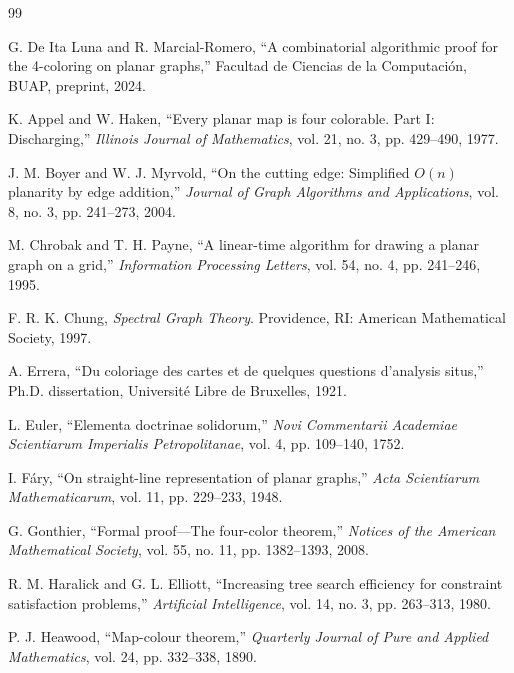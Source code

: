\documentclass[12pt,letterpaper]{article}
\theoremstyle{plain}
\theoremstyle{definition}
\theoremstyle{remark}
\begin{document}
\newpage

\begin{thebibliography}{99}

G. De Ita Luna and R. Marcial-Romero,
``A combinatorial algorithmic proof for the 4-coloring on planar graphs,''
Facultad de Ciencias de la Computaci\'on, BUAP, preprint, 2024.

K. Appel and W. Haken,
``Every planar map is four colorable. Part I: Discharging,''
\textit{Illinois Journal of Mathematics}, vol. 21, no. 3, pp. 429--490, 1977.

J. M. Boyer and W. J. Myrvold,
``On the cutting edge: Simplified $O(n)$ planarity by edge addition,''
\textit{Journal of Graph Algorithms and Applications}, vol. 8, no. 3,
pp. 241--273, 2004.

M. Chrobak and T. H. Payne,
``A linear-time algorithm for drawing a planar graph on a grid,''
\textit{Information Processing Letters}, vol. 54, no. 4, pp. 241--246, 1995.

F. R. K. Chung,
\textit{Spectral Graph Theory}.
Providence, RI: American Mathematical Society, 1997.

A. Errera,
``Du coloriage des cartes et de quelques questions d'analysis situs,''
Ph.D. dissertation, Universit\'e Libre de Bruxelles, 1921.

L. Euler,
``Elementa doctrinae solidorum,''
\textit{Novi Commentarii Academiae Scientiarum Imperialis Petropolitanae},
vol. 4, pp. 109--140, 1752.

I. F\'ary,
``On straight-line representation of planar graphs,''
\textit{Acta Scientiarum Mathematicarum}, vol. 11, pp. 229--233, 1948.

G. Gonthier,
``Formal proof---The four-color theorem,''
\textit{Notices of the American Mathematical Society}, vol. 55, no. 11,
pp. 1382--1393, 2008.

R. M. Haralick and G. L. Elliott,
``Increasing tree search efficiency for constraint satisfaction problems,''
\textit{Artificial Intelligence}, vol. 14, no. 3, pp. 263--313, 1980.

P. J. Heawood,
``Map-colour theorem,''
\textit{Quarterly Journal of Pure and Applied Mathematics}, vol. 24,
pp. 332--338, 1890.


\end{thebibliography}
\end{document}
